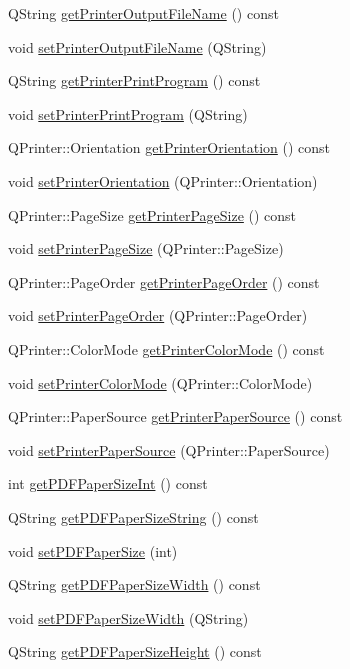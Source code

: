 \begin{CompactItemize}
\item 
QString \hyperlink{classSettings_a23}{get\-Printer\-Output\-File\-Name} () const
\item 
void \hyperlink{classSettings_a24}{set\-Printer\-Output\-File\-Name} (QString)
\item 
QString \hyperlink{classSettings_a25}{get\-Printer\-Print\-Program} () const
\item 
void \hyperlink{classSettings_a26}{set\-Printer\-Print\-Program} (QString)
\item 
QPrinter::Orientation \hyperlink{classSettings_a27}{get\-Printer\-Orientation} () const
\item 
void \hyperlink{classSettings_a28}{set\-Printer\-Orientation} (QPrinter::Orientation)
\item 
QPrinter::Page\-Size \hyperlink{classSettings_a29}{get\-Printer\-Page\-Size} () const
\item 
void \hyperlink{classSettings_a30}{set\-Printer\-Page\-Size} (QPrinter::Page\-Size)
\item 
QPrinter::Page\-Order \hyperlink{classSettings_a31}{get\-Printer\-Page\-Order} () const
\item 
void \hyperlink{classSettings_a32}{set\-Printer\-Page\-Order} (QPrinter::Page\-Order)
\item 
QPrinter::Color\-Mode \hyperlink{classSettings_a33}{get\-Printer\-Color\-Mode} () const
\item 
void \hyperlink{classSettings_a34}{set\-Printer\-Color\-Mode} (QPrinter::Color\-Mode)
\item 
QPrinter::Paper\-Source \hyperlink{classSettings_a35}{get\-Printer\-Paper\-Source} () const
\item 
void \hyperlink{classSettings_a36}{set\-Printer\-Paper\-Source} (QPrinter::Paper\-Source)
\item 
int \hyperlink{classSettings_a37}{get\-PDFPaper\-Size\-Int} () const
\item 
QString \hyperlink{classSettings_a38}{get\-PDFPaper\-Size\-String} () const
\item 
void \hyperlink{classSettings_a39}{set\-PDFPaper\-Size} (int)
\item 
QString \hyperlink{classSettings_a40}{get\-PDFPaper\-Size\-Width} () const
\item 
void \hyperlink{classSettings_a41}{set\-PDFPaper\-Size\-Width} (QString)
\item 
QString \hyperlink{classSettings_a42}{get\-PDFPaper\-Size\-Height} () const
\item 

\end{CompactItemize}
